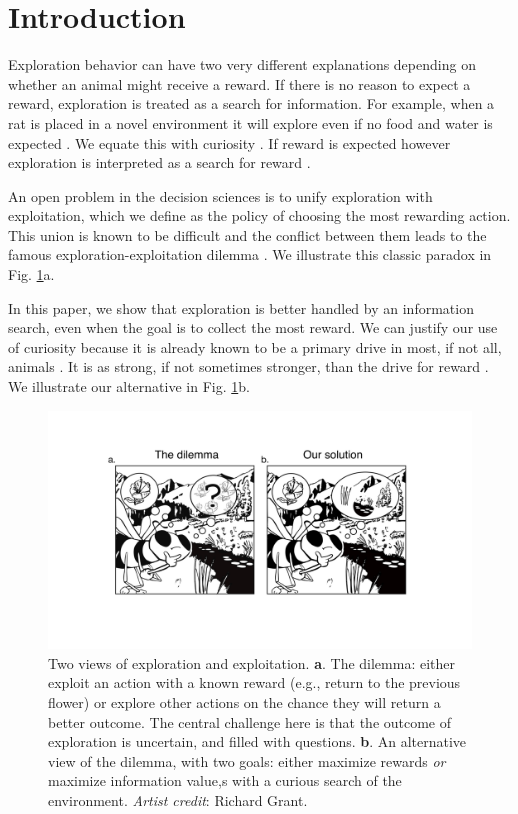 \section*{Introduction}
Exploration behavior can have two very different explanations depending on whether an animal might receive a reward. If there is no reason to expect a reward, exploration is treated as a search for information. For example, when a rat is placed in a novel environment it will explore even if no food and water is expected \cite{Berlyne1950}. We equate this with curiosity \cite{Berlyne1950,Schmidhuber1991,Kidd2015,Jaegle2019,Sumner2019,Wang2019,Auersperg2015}. If reward is expected however exploration is interpreted as a search for reward \cite{Gupta2006,Sutton2018,Woodgate2017,Lee2011a,Schulz2018a,Calhoun2014}.

An open problem in the decision sciences is to unify exploration with exploitation, which we define as the policy of choosing the most rewarding action. This union is known to be difficult and the conflict between them leads to the famous exploration-exploitation dilemma \citep{Kelly1956,Berger-Tal2014,Dayan1996,Thrun1992,Mehlhorn2015,Kobayashi2019}. We illustrate this classic paradox in Fig. \ref{fig:bee}a.

In this paper, we show that exploration is better handled by an information search, even when the goal is to collect the most reward. We can justify our use of curiosity because it is already known to be a primary drive in most, if not all, animals \cite{Berlyne1950,Loewenstein1994,Inglis2001}. It is as strong, if not sometimes stronger, than the drive for reward \cite{Loewenstein1994,Kidd2015,Gottlieb2018,Sumner2019,Gopnik2020,Song2019,Wang2019}. We illustrate our alternative in Fig. \ref{fig:bee}b.

\begin{figure}
	\begin{fullwidth}
	\includegraphics[width=.9\linewidth]{img/bee.pdf} 
	\caption{Two views of exploration and exploitation. \textbf{a}. The dilemma: either exploit an action with a known reward (e.g., return to the previous flower) or explore other actions on the chance they will return a better outcome. The central challenge here is that the outcome of exploration is uncertain, and filled with questions. \textbf{b}. An alternative view of the dilemma, with two goals: either maximize rewards \textit{or} maximize information value,s with a curious search of the environment. \textit{Artist credit}: Richard Grant.}
	\label{fig:bee} 
	\end{fullwidth}
\end{figure}

